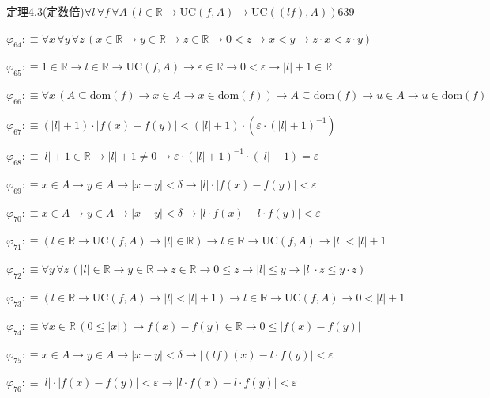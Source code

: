 \begin{fullproof}{定理4.3(定数倍)}{$\forall l\,\forall f\,\forall A\,(l \in \mathbb{R} \to \mathrm{UC}(f,A) \to \mathrm{UC}((l f),A))$}{639}
\begin{abbrevlist}
\item $\varphi_{64} :\equiv \forall x\,\forall y\,\forall z\,(x \in \mathbb{R} \to y \in \mathbb{R} \to z \in \mathbb{R} \to 0 < z \to x < y \to z \cdot x < z \cdot y)$
\item $\varphi_{65} :\equiv 1 \in \mathbb{R} \to l \in \mathbb{R} \to \mathrm{UC}(f,A) \to \varepsilon \in \mathbb{R} \to 0 < \varepsilon \to \lvert l \rvert + 1 \in \mathbb{R}$
\item $\varphi_{66} :\equiv \forall x\,(A \subseteq \mathrm{dom}(f) \to x \in A \to x \in \mathrm{dom}(f)) \to A \subseteq \mathrm{dom}(f) \to u \in A \to u \in \mathrm{dom}(f)$
\item $\varphi_{67} :\equiv (\lvert l \rvert + 1) \cdot \lvert f(x) - f(y) \rvert < (\lvert l \rvert + 1) \cdot (\varepsilon \cdot (\lvert l \rvert + 1)^{-1})$
\item $\varphi_{68} :\equiv \lvert l \rvert + 1 \in \mathbb{R} \to \lvert l \rvert + 1 \neq 0 \to \varepsilon \cdot (\lvert l \rvert + 1)^{-1} \cdot (\lvert l \rvert + 1) = \varepsilon$
\item $\varphi_{69} :\equiv x \in A \to y \in A \to \lvert x - y \rvert < \delta \to \lvert l \rvert \cdot \lvert f(x) - f(y) \rvert < \varepsilon$
\item $\varphi_{70} :\equiv x \in A \to y \in A \to \lvert x - y \rvert < \delta \to \lvert l \cdot f(x) - l \cdot f(y) \rvert < \varepsilon$
\item $\varphi_{71} :\equiv (l \in \mathbb{R} \to \mathrm{UC}(f,A) \to \lvert l \rvert \in \mathbb{R}) \to l \in \mathbb{R} \to \mathrm{UC}(f,A) \to \lvert l \rvert < \lvert l \rvert + 1$
\item $\varphi_{72} :\equiv \forall y\,\forall z\,(\lvert l \rvert \in \mathbb{R} \to y \in \mathbb{R} \to z \in \mathbb{R} \to 0 \leq z \to \lvert l \rvert \leq y \to \lvert l \rvert \cdot z \leq y \cdot z)$
\item $\varphi_{73} :\equiv (l \in \mathbb{R} \to \mathrm{UC}(f,A) \to \lvert l \rvert < \lvert l \rvert + 1) \to l \in \mathbb{R} \to \mathrm{UC}(f,A) \to 0 < \lvert l \rvert + 1$
\item $\varphi_{74} :\equiv \forall x \in \mathbb{R}\,(0 \leq \lvert x \rvert) \to f(x) - f(y) \in \mathbb{R} \to 0 \leq \lvert f(x) - f(y) \rvert$
\item $\varphi_{75} :\equiv x \in A \to y \in A \to \lvert x - y \rvert < \delta \to \lvert (l f)(x) - l \cdot f(y) \rvert < \varepsilon$
\item $\varphi_{76} :\equiv \lvert l \rvert \cdot \lvert f(x) - f(y) \rvert < \varepsilon \to \lvert l \cdot f(x) - l \cdot f(y) \rvert < \varepsilon$

\end{abbrevlist}
\end{fullproof}
